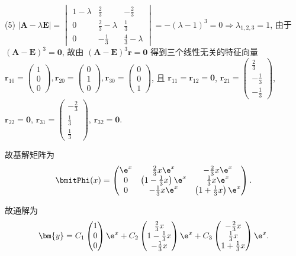 \begin{solve}
  (5) $|\bm{A}-\lambda\bm{E}|=\begin{vmatrix}1-\lambda&\frac{2}{3}&-\frac{2}{3}\\0&\frac{2}{3}-\lambda&\frac{1}{3}\\0&-\frac{1}{3}&\frac{4}{3}-\lambda\end{vmatrix}=-(\lambda-1)^3=0\Rightarrow\lambda_{1,2,3}=1$, 
  由于 $(\bm{A}-\bm{E})^3=\bm{0}$, 
  故由 $(\bm{A}-\bm{E})^3\bm{r}=\bm{0}$ 得到三个线性无关的特征向量
  $\bm{r}_{10}=\begin{pmatrix}1\\0\\0\end{pmatrix},\bm{r}_{20}=\begin{pmatrix}0\\1\\0\end{pmatrix},\bm{r}_{30}=\begin{pmatrix}0\\0\\1\end{pmatrix}$, 
  且 $\bm{r}_{11}=\bm{r}_{12}=\bm{0}$, $\bm{r}_{21}=\begin{pmatrix}\frac{2}{3}\\-\frac{1}{3}\\-\frac{1}{3}\end{pmatrix}$,
  $\bm{r}_{22}=\bm{0}$, $\bm{r}_{31}=\begin{pmatrix}-\frac{2}{3}\\\frac{1}{3}\\\frac{1}{3}\end{pmatrix}$,
  $\bm{r}_{32}=\bm{0}$.

  故基解矩阵为
  \[\bmitPhi(x)=
  \begin{pmatrix}
    \e^x &\frac{2}{3}x\e^x                & -\frac{2}{3}x\e^x \\
    0    &\left(1-\frac{1}{3}x\right)\e^x & \frac{1}{3}x\e^x \\
    0    &-\frac{1}{3}x\e^x               & \left(1+\frac{1}{3}x\right)\e^x
  \end{pmatrix}.\]

  故通解为
  \[\bm{y} = C_1\begin{pmatrix}1\\0\\0\end{pmatrix}\e^x
    + C_2\begin{pmatrix}\frac{2}{3}x\\1-\frac{1}{3}x\\-\frac{1}{3}x\end{pmatrix}\e^x
    + C_3\begin{pmatrix}-\frac{2}{3}x\\\frac{1}{3}x\\1+\frac{1}{3}x\end{pmatrix}\e^x.\]


\end{solve}
